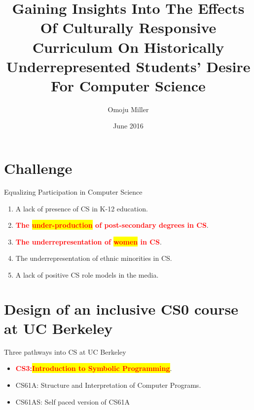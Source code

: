 \documentclass{beamer}                  %
\title[Culturally Responsive CS]{Gaining Insights Into The Effects Of Culturally Responsive Curriculum On Historically Underrepresented Students’ Desire For Computer Science}
\author[Miller]{Omoju Miller}
\institute[UC Berkeley]{University of California, Berkeley }
\date{June 2016}
\newcommand{\hilight}[1]{\colorbox{yellow}{#1}}
\begin{document}
\section{}
        \begin{frame}[plain]
            \titlepage 
        \end{frame}

\section{Challenge}
  \begin{frame}{}
    \begin{center}
      {\LARGE Equalizing Participation in Computer Science}
      \begin{enumerate}
                \item A lack of presence of CS in K-12 education.
                \item \textcolor{red}{\textbf{The \hilight{under-production} of post-secondary degrees in CS}}. 
                \item \textcolor{red}{\textbf{The underrepresentation of \hilight{women} in CS}}.
                \item The underrepresentation of ethnic minorities in CS.
                \item A lack of positive CS role models in the media. 
                
      \end{enumerate}
    \end{center}
  \end{frame}

\section{Design of an inclusive CS0 course at UC Berkeley}
        \begin{frame}{}
        Three pathways into CS at UC Berkeley
            \begin{itemize}
                \item \textcolor{red}{\textbf{CS3:\hilight{Introduction to Symbolic Programming}}}.
                \item CS61A: Structure and Interpretation of Computer Programs.
                \item CS61AS: Self paced version of CS61A
            \end{itemize}
        \end{frame}
\end{document}
